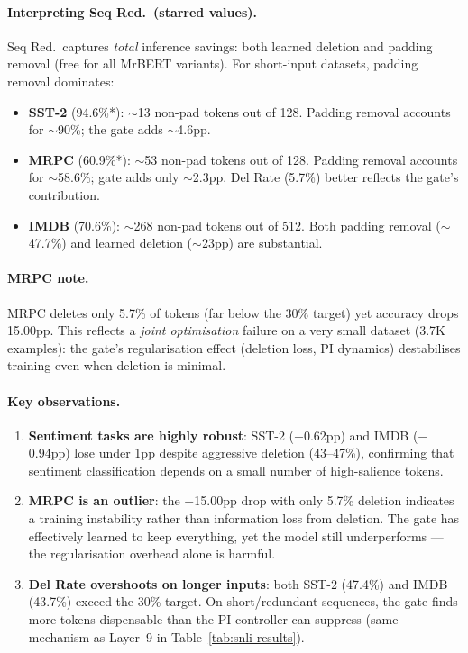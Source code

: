 \documentclass{article} %
\begin{document}
\paragraph{Interpreting Seq Red.\ (starred values).}
Seq Red.\ captures \emph{total} inference savings: both learned deletion and padding removal (free for all MrBERT variants). For short-input datasets, padding removal dominates:
\begin{itemize}[nosep]
    \item \textbf{SST-2} (94.6\%*): $\sim$13 non-pad tokens out of 128. Padding removal accounts for $\sim$90\%; the gate adds $\sim$4.6pp.
    \item \textbf{MRPC} (60.9\%*): $\sim$53 non-pad tokens out of 128. Padding removal accounts for $\sim$58.6\%; gate adds only $\sim$2.3pp. Del Rate (5.7\%) better reflects the gate's contribution.
    \item \textbf{IMDB} (70.6\%): $\sim$268 non-pad tokens out of 512. Both padding removal ($\sim$47.7\%) and learned deletion ($\sim$23pp) are substantial.
\end{itemize}

\paragraph{MRPC note.}
MRPC deletes only 5.7\% of tokens (far below the 30\% target) yet accuracy drops 15.00pp. This reflects a \emph{joint optimisation} failure on a very small dataset (3.7K examples): the gate's regularisation effect (deletion loss, PI dynamics) destabilises training even when deletion is minimal.

\paragraph{Key observations.}
\begin{enumerate}[nosep]
    \item \textbf{Sentiment tasks are highly robust}: SST-2 ($-$0.62pp) and IMDB ($-$0.94pp) lose under 1pp despite aggressive deletion (43--47\%), confirming that sentiment classification depends on a small number of high-salience tokens.
    \item \textbf{MRPC is an outlier}: the $-$15.00pp drop with only 5.7\% deletion indicates a training instability rather than information loss from deletion. The gate has effectively learned to keep everything, yet the model still underperforms --- the regularisation overhead alone is harmful.
    \item \textbf{Del Rate overshoots on longer inputs}: both SST-2 (47.4\%) and IMDB (43.7\%) exceed the 30\% target. On short/redundant sequences, the gate finds more tokens dispensable than the PI controller can suppress (same mechanism as Layer~9 in Table~\ref{tab:snli-results}).
\end{enumerate}
\end{document}
